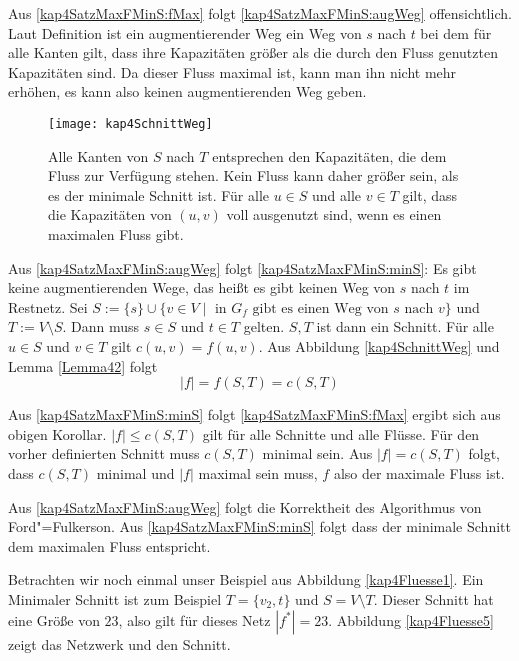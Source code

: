 \begin{Bew}
  \hspace{\parindent}Aus \ref{kap4SatzMaxFMinS:fMax} folgt \ref{kap4SatzMaxFMinS:augWeg} offensichtlich. Laut Definition ist ein augmentierender Weg ein Weg von $s$ nach $t$ bei dem für alle Kanten gilt, dass ihre Kapazitäten größer als die durch den Fluss genutzten Kapazitäten sind. Da dieser Fluss maximal ist, kann man ihn nicht mehr erhöhen, es kann also keinen augmentierenden Weg geben.
  
  \begin{figure}[htb]
    \centering
    \texttt{[image: kap4SchnittWeg]}
    \caption{Alle Kanten von $S$ nach $T$ entsprechen den Kapazitäten, die dem Fluss zur Verfügung stehen. Kein Fluss kann daher größer sein, als es der minimale Schnitt ist. Für alle $u \in S$ und alle $v \in T$ gilt, dass die Kapazitäten von $(u,v)$ voll ausgenutzt sind, wenn es einen maximalen Fluss gibt.}
    \label{kap4SchnittWeg}
  \end{figure}
  
  Aus \ref{kap4SatzMaxFMinS:augWeg} folgt \ref{kap4SatzMaxFMinS:minS}: Es gibt keine augmentierenden Wege, das heißt es gibt keinen Weg von $s$ nach $t$ im Restnetz. Sei $S := \{ s \} \cup \{v \in V \mid \text{ in } G_f \text{ gibt es einen Weg von $s$ nach $v$}\}$ und $T := V \setminus S$. Dann muss $s \in S$ und $t \in T$ gelten. $S, T$ ist dann ein Schnitt. Für alle $u \in S$ und $v \in T$ gilt $c(u,v) = f(u,v)$. Aus Abbildung \vref{kap4SchnittWeg} und Lemma \ref{Lemma42} folgt
  \[ |f| = f(S,T) = c(S,T) \]
  
      
  Aus \ref{kap4SatzMaxFMinS:minS} folgt \ref{kap4SatzMaxFMinS:fMax} ergibt sich aus obigen Korollar. $|f| \le c(S,T)$ gilt für alle Schnitte und alle Flüsse. Für den vorher definierten Schnitt muss $c(S,T)$ minimal sein. Aus $|f| = c(S,T)$ folgt, dass $c(S,T)$ minimal und $|f|$ maximal sein muss, $f$ also der maximale Fluss ist.
\end{Bew}

Aus \ref{kap4SatzMaxFMinS:augWeg} folgt die Korrektheit des Algorithmus von Ford"=Fulkerson. Aus \ref{kap4SatzMaxFMinS:minS} folgt dass der minimale Schnitt dem maximalen Fluss entspricht.

Betrachten wir noch einmal unser Beispiel aus Abbildung \vref{kap4Fluesse1}. Ein Minimaler Schnitt ist zum Beispiel $T = \{ v_2, t \}$ und $S = V \setminus T$. Dieser Schnitt hat eine Größe von $23$, also gilt für dieses Netz $|f^*| = 23$. Abbildung \vref{kap4Fluesse5} zeigt das Netzwerk und den Schnitt.

